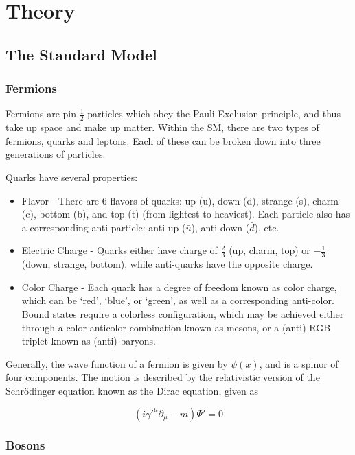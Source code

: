 \chapter{Theory}
    \section{The Standard Model}

        \subsection{Fermions}
        Fermions are pin-$\frac{1}{2}$ particles which obey the Pauli Exclusion principle, and thus take up space and make up matter. Within the \gls{SM}, there are two types of fermions, quarks and leptons. Each of these can be broken down into three generations of particles.

        Quarks have several properties:
        \begin{itemize}
            \item Flavor - There are 6 flavors of quarks: up (u), down (d), strange (s), charm (c), bottom (b), and top (t) (from lightest to heaviest). Each particle also has a corresponding anti-particle: anti-up ($\bar{u}$), anti-down ($\bar{d}$), etc.
            \item Electric Charge - Quarks either have charge of $\frac{2}{3}$ (up, charm, top) or $-\frac{1}{3}$ (down, strange, bottom), while anti-quarks have the opposite charge. 
            \item Color Charge - Each quark has a degree of freedom known as color charge, which can be `red', `blue', or `green', as well as a corresponding anti-color. Bound states require a colorless configuration, which may be achieved either through a color-anticolor combination known as mesons, or a (anti)-RGB triplet known as (anti)-baryons.
        \end{itemize}


        Generally, the wave function of a fermion is given by $\psi(x)$, and is a spinor of four components. The motion is described by the relativistic version of the Schr{\"o}dinger equation known as the Dirac equation, given as

        \begin{equation}
            (i\gamma'^{\mu}\partial_{\mu}-m)\Psi' = 0
        \end{equation}


        \subsection{Bosons}


